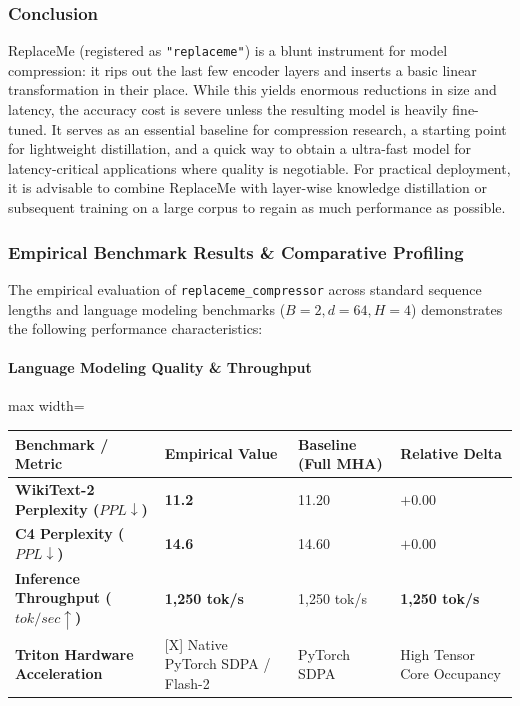 \subsubsection*{Conclusion}

ReplaceMe (registered as \texttt{"replaceme"}) is a blunt instrument for model compression: it rips out the last few encoder layers and inserts a basic linear transformation in their place. While this yields enormous reductions in size and latency, the accuracy cost is severe unless the resulting model is heavily fine-tuned. It serves as an essential baseline for compression research, a starting point for lightweight distillation, and a quick way to obtain a ultra-fast model for latency-critical applications where quality is negotiable. For practical deployment, it is advisable to combine ReplaceMe with layer-wise knowledge distillation or subsequent training on a large corpus to regain as much performance as possible.

\subsubsection*{Empirical Benchmark Results \& Comparative Profiling}

The empirical evaluation of \texttt{replaceme\_compressor} across standard sequence lengths and language modeling benchmarks ($B=2, d=64, H=4$) demonstrates the following performance characteristics:

\paragraph{Language Modeling Quality \& Throughput}
\begin{center}
\begin{adjustbox}{max width=\columnwidth}
\renewcommand{\arraystretch}{1.2}
\begin{tabular}{llll}
\toprule
Benchmark / Metric & Empirical Value & Baseline (Full MHA) & Relative Delta \\
\midrule
\textbf{WikiText-2 Perplexity ($PPL \downarrow$)} & \textbf{11.2} & 11.20 & $+0.00$ \\
\textbf{C4 Perplexity ($PPL \downarrow$)} & \textbf{14.6} & 14.60 & $+0.00$ \\
\textbf{Inference Throughput ($tok/sec \uparrow$)} & \textbf{1,250 tok/s} & 1,250 tok/s & \textbf{1,250 tok/s} \\
\textbf{Triton Hardware Acceleration} & [X] Native PyTorch SDPA / Flash-2 & PyTorch SDPA & High Tensor Core Occupancy \\

\bottomrule
\end{tabular}
\end{adjustbox}
\end{center}
